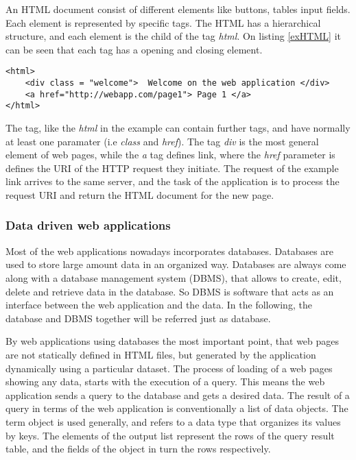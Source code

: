 

An HTML document consist of different elements like buttons, tables input fields. Each element is represented by specific tags. The HTML has a hierarchical structure, and each element is the child of the tag \textit{html}. On listing \ref{exHTML} it can be seen that each tag has a opening and closing element. 

\begin{lstlisting}[captionpos=b, caption=Example HTML document, label=exHTML, belowskip=1em, aboveskip=2em,
basicstyle=\footnotesize,frame=single]
<html>
	<div class = "welcome">  Welcome on the web application </div>
	<a href="http://webapp.com/page1"> Page 1 </a>
</html>
\end{lstlisting}

The tag, like the \textit{html} in the example can contain further tags, and have normally at least one paramater (i.e \textit{class} and \textit{href}). The tag \textit{div} is the most general element of web pages, while the \textit{a} tag defines link, where the \textit{href} parameter is defines the URI of the HTTP request they initiate. The request of the example link arrives to the same server, and the task of the application is to process the request URI and return the HTML document for the new page. 


\subsubsection{Data driven web applications} \label{dataDriven}

Most of the web applications nowadays incorporates databases. Databases are used to store large amount data in an organized way. Databases are always come along with a database management system (DBMS), that allows to create, edit, delete and retrieve data in the database. So DBMS is software that acts as an interface between the web application and the data. In the following, the database and DBMS together will be referred just as database.  

By web applications using databases the most important point, that web pages are not statically defined in HTML files, but generated by the application dynamically using a particular dataset. The process of loading of a web pages showing any data, starts with the execution of a query. This means the web application sends a query to the database and gets a desired data. The result of a query in terms of the web application is conventionally a list of data objects.  The term object is used generally, and refers to a data type that organizes its values by keys. The elements of the output list represent the rows of the query result table, and the fields of the object in turn the rows respectively. 

